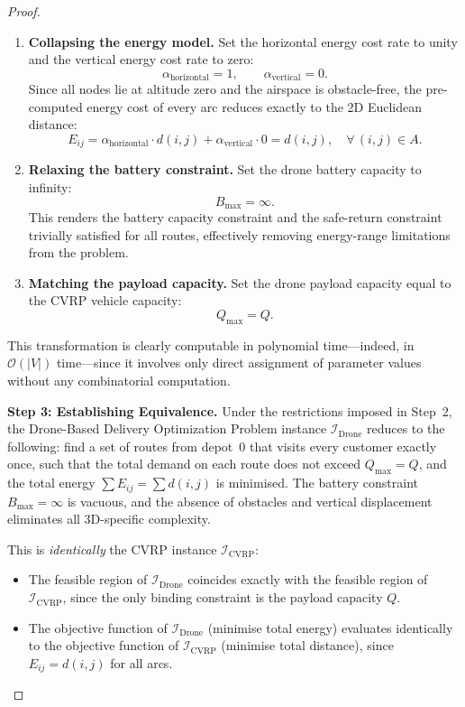 \documentclass[11pt,a4paper]{article}
\begin{document}
\begin{proof}
\begin{enumerate}
  \item \textbf{Collapsing the energy model.}\quad
    Set the horizontal energy cost rate to unity and the vertical energy cost rate to zero:
    \[
      \alpha_{\text{horizontal}} = 1, \qquad \alpha_{\text{vertical}} = 0.
    \]
    Since all nodes lie at altitude zero and the airspace is obstacle-free, the pre-computed energy cost of every arc reduces exactly to the 2D Euclidean distance:
    \[
      E_{ij} = \alpha_{\text{horizontal}} \cdot d(i,j) + \alpha_{\text{vertical}} \cdot 0 = d(i,j), \quad \forall\, (i,j) \in A.
    \]

  \item \textbf{Relaxing the battery constraint.}\quad
    Set the drone battery capacity to infinity:
    \[
      B_{\max} = \infty.
    \]
    This renders the battery capacity constraint and the safe-return constraint trivially satisfied for all routes, effectively removing energy-range limitations from the problem.

  \item \textbf{Matching the payload capacity.}\quad
    Set the drone payload capacity equal to the CVRP vehicle capacity:
    \[
      Q_{\max} = Q.
    \]
\end{enumerate}

\noindent This transformation is clearly computable in polynomial time---indeed, in $\mathcal{O}(|V|)$ time---since it involves only direct assignment of parameter values without any combinatorial computation.

\medskip

\noindent\textbf{Step 3: Establishing Equivalence.}\quad
Under the restrictions imposed in Step~2, the Drone-Based Delivery Optimization Problem instance $\mathcal{I}_{\text{Drone}}$ reduces to the following: find a set of routes from depot~$0$ that visits every customer exactly once, such that the total demand on each route does not exceed $Q_{\max} = Q$, and the total energy $\sum E_{ij} = \sum d(i,j)$ is minimised. The battery constraint $B_{\max} = \infty$ is vacuous, and the absence of obstacles and vertical displacement eliminates all 3D-specific complexity.

This is \emph{identically} the CVRP instance $\mathcal{I}_{\text{CVRP}}$:
\begin{itemize}
  \item The feasible region of $\mathcal{I}_{\text{Drone}}$ coincides exactly with the feasible region of $\mathcal{I}_{\text{CVRP}}$, since the only binding constraint is the payload capacity $Q$.
  \item The objective function of $\mathcal{I}_{\text{Drone}}$ (minimise total energy) evaluates identically to the objective function of $\mathcal{I}_{\text{CVRP}}$ (minimise total distance), since $E_{ij} = d(i,j)$ for all arcs.
\end{itemize}


\end{proof}
\end{document}
